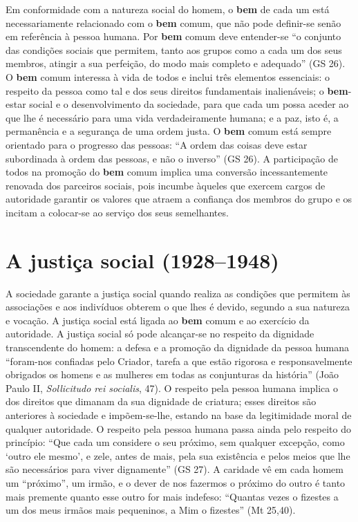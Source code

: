 Em conformidade com a natureza social do homem, o \textbf{bem} de cada um está necessariamente relacionado com o \textbf{bem} comum, que não pode definir-se senão em referência à pessoa humana. Por \textbf{bem} comum deve entender-se ``o conjunto das condições sociais que permitem, tanto aos grupos como a cada um dos seus membros, atingir a sua perfeição, do modo mais completo e adequado'' (GS 26). O \textbf{bem} comum interessa à vida de todos e inclui três elementos essenciais: o respeito da pessoa como tal e dos seus direitos fundamentais inalienáveis; o \textbf{bem}-estar social e o desenvolvimento da sociedade, para que cada um possa aceder ao que lhe é necessário para uma vida verdadeiramente humana; e a paz, isto é, a permanência e a segurança de uma ordem justa. O \textbf{bem} comum está sempre orientado para o progresso das pessoas: ``A ordem das coisas deve estar subordinada à ordem das pessoas, e não o inverso'' (GS 26). A participação de todos na promoção do \textbf{bem} comum implica uma conversão incessantemente renovada dos parceiros sociais, pois incumbe àqueles que exercem cargos de autoridade garantir os valores que atraem a confiança dos membros do grupo e os incitam a colocar-se ao serviço dos seus semelhantes.

\section{A justiça social (1928--1948)}

A sociedade garante a justiça social quando realiza as condições que permitem às associações e aos indivíduos obterem o que lhes é devido, segundo a sua natureza e vocação. A justiça social está ligada ao \textbf{bem} comum e ao exercício da autoridade. A justiça social só pode alcançar-se no respeito da dignidade transcendente do homem: a defesa e a promoção da dignidade da pessoa humana ``foram-nos confiadas pelo Criador, tarefa a que estão rigorosa e responsavelmente obrigados os homens e as mulheres em todas as conjunturas da história'' (João Paulo II, \textit{Sollicitudo rei socialis}, 47). O respeito pela pessoa humana implica o dos direitos que dimanam da sua dignidade de criatura; esses direitos são anteriores à sociedade e impõem-se-lhe, estando na base da legitimidade moral de qualquer autoridade. O respeito pela pessoa humana passa ainda pelo respeito do princípio: ``Que cada um considere o seu próximo, sem qualquer excepção, como `outro ele mesmo', e zele, antes de mais, pela sua existência e pelos meios que lhe são necessários para viver dignamente'' (GS 27). A caridade vê em cada homem um ``próximo'', um irmão, e o dever de nos fazermos o próximo do outro é tanto mais premente quanto esse outro for mais indefeso: ``Quantas vezes o fizestes a um dos meus irmãos mais pequeninos, a Mim o fizestes'' (Mt 25,40).

